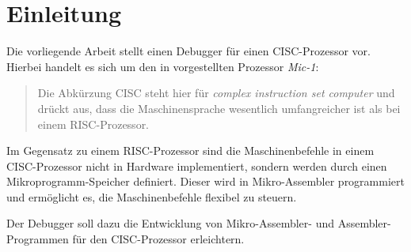 \chapter{Einleitung}
Die vorliegende Arbeit stellt einen Debugger für einen CISC-Prozessor vor. Hierbei handelt es sich um den in \cite{Stroetmann2007} vorgestellten Prozessor \emph{Mic-1}:
\begin{quote}
Die Abkürzung CISC steht hier für \emph{complex instruction set computer} und drückt aus, dass die Maschinensprache wesentlich umfangreicher ist als bei einem RISC-Prozessor.
\end{quote}

Im Gegensatz zu einem RISC-Prozessor sind die Maschinenbefehle in einem CISC-Prozessor nicht in Hardware implementiert, sondern werden durch einen Mikroprogramm-Speicher definiert. Dieser wird in Mikro-Assembler programmiert und ermöglicht es, die Maschinenbefehle flexibel zu steuern.

Der Debugger soll dazu die Entwicklung von Mikro-Assembler- und Assembler-Programmen für den CISC-Prozessor erleichtern.